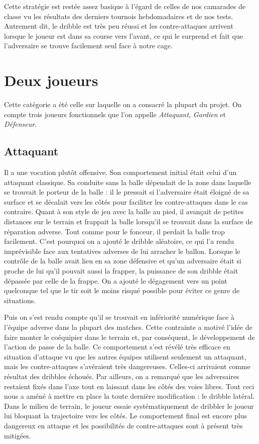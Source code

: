 \documentclass[12pt,a4paper]{article}
\begin{document}
Cette strat\'egie est rest\'ee assez basique \`a l'\'egard de celles de nos 
camarades de classe vu les r\'esultats des derniers tournois hebdomadaires et 
de nos tests. Autrement dit, le dribble est tr\`es peu r\'eussi et les 
contre-attaques arrivent lorsque le joueur est dans sa course vers l'avant, ce 
qui le surprend et fait que l'adversaire se trouve facilement seul face \`a 
notre cage.

\section{Deux joueurs}
Cette cat\'egorie a \'et\'e celle sur laquelle on a consacr\'e la plupart du 
projet. On compte trois joueurs fonctionnels que l'on appelle 
{\itshape Attaquant}, {\itshape Gardien} et {\itshape D\'efenseur}. 

\subsection*{Attaquant}
Il a une vocation plut\^ot offensive. Son comportement initial \'etait celui 
d'un attaquant classique. 
Sa conduite sans la balle d\'ependait de la zone dans laquelle se trouvait le 
porteur de la balle : il le pressait si l'adversaire \'etait \'eloign\'e de sa 
surface et se d\'ecalait vers les c\^ot\'es pour faciliter les contre-attaques 
dans le cas contraire. 
Quant \`a son style de jeu avec la balle au pied, il avan\c{c}ait de petites 
distances sur le terrain et frappait la balle lorsqu'il se trouvait dans la 
surface de r\'eparation adverse. Tout comme pour le fonceur, il perdait la balle 
trop facilement. 
C'est pourquoi on a ajout\'e le dribble al\'eatoire, ce qui l'a rendu 
impr\'evisible face aux tentatives adverses de lui arracher le ballon. 
Lorsque le contr\^ole de la balle avait lieu en sa zone d\'efensive et qu'un 
adversaire \'etait si proche de lui qu'il pouvait aussi la frapper, la 
puissance de son dribble \'etait d\'epass\'ee par celle de la frappe. On a 
ajout\'e le d\'egagement vers un point quelconque tel que le tir soit le moins 
risqu\'e possible pour \'eviter ce genre de situations.

Puis on s'est rendu compte qu'il se trouvait en inf\'eriorit\'e num\'erique face 
\`a l'\'equipe adverse dans la plupart des matches. Cette contrainte a motiv\'e 
l'id\'ee de faire monter le co\'equipier dans le terrain et, par cons\'equent, 
le d\'eveloppement de l'action de passe de la balle.
Ce comportement s'est r\'ev\'el\'e tr\`es efficace en situation d'attaque vu 
que les autres \'equipes utilisent seulement un attaquant, mais les 
contre-attaques s'av\'eraient tr\`es dangereuses. Celles-ci arrivaient comme 
r\'esultat des dribbles \'echou\'es. Par ailleurs, on a remarqu\'e que les 
adversaires restaient fix\'es dans l'axe tout en laissant dans les c\^ot\'es 
des voies libres. Tout ceci nous a am\'en\'e \`a mettre en place la toute 
derni\`ere modification : le dribble lat\'eral. Dans le milieu de terrain, le 
joueur essaie syst\'ematiquement de dribbler le joueur lui bloquant la 
trajectoire vers les c\^ot\'es. Le comportement final est encore plus 
dangereux en attaque et les possibilit\'es de contre-attaques sont \`a 
pr\'esent tr\`es mitig\'ees.
\end{document}
